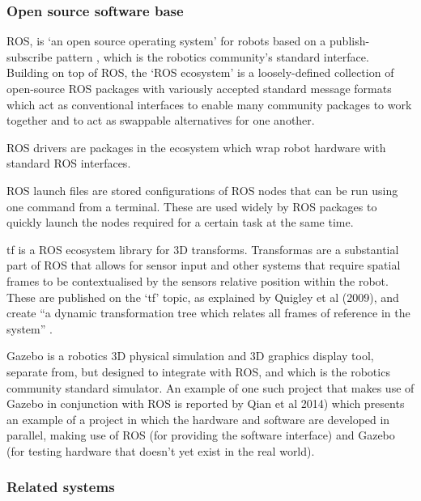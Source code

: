 \documentclass[a4paper]{article}
\begin{document}
\subsubsection{Open source software base}

ROS, is `an open source operating system' for robots based on a publish-subscribe pattern \cite{quigley2009ros}, which is the robotics community’s standard interface. Building on top of ROS, the `ROS ecosystem’ is a loosely-defined collection of open-source ROS packages with variously accepted standard message formats which act as conventional interfaces to enable many community packages to work together and to act as swappable alternatives for one another.   

ROS drivers are packages in the ecosystem which wrap robot hardware with standard ROS interfaces.

ROS launch files are stored configurations of ROS nodes that can be run using one command from a terminal. These are used widely by ROS packages to quickly launch the nodes required for a certain task at the same time.

tf is a ROS ecosystem library for 3D transforms. Transformas are a substantial part of ROS that allows for sensor input and other systems that require spatial frames to be contextualised by the sensors relative position within the robot. These are published on the ‘tf’ topic, as explained by Quigley et al (2009), and create “a dynamic transformation tree which relates all frames of reference in the system” .

Gazebo \cite{koenig2004design} is a robotics 3D physical simulation and 3D graphics display tool, separate from, but designed to integrate with ROS, and which is the robotics community standard simulator.  An example of one such project that makes use of Gazebo in conjunction with ROS is reported by Qian et al 2014) which presents an example of a project in which the hardware and software are developed in parallel, making use of ROS (for providing the software interface) and Gazebo (for testing hardware that doesn’t yet exist in the real world). 


\subsubsection{Related systems}
\end{document}
